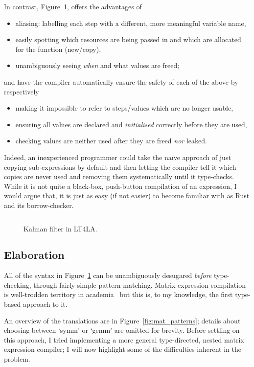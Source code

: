 In contrast, Figure~\ref{fig:ltfla_kalman}, offers the advantages of
\begin{itemize}
    \item aliasing: labelling each step with a different, more meaningful variable name,
    \item easily spotting which resources are being passed in and which are
        allocated for the function (new/copy),
    \item unambiguously seeing \emph{when} and what values are freed;
\end{itemize}
and have the compiler automatically ensure the safety of each of the above by respectively
\begin{itemize}
    \item making it impossible to refer to steps/values which are no longer usable,
    \item ensuring all values are declared and \emph{initialised} correctly before they are used,
    \item checking values are neither used after they are freed \emph{nor} leaked.
\end{itemize}

Indeed, an inexperienced programmer could take the  na\"ive approach of just
copying sub-expressions by default and then letting the compiler tell it which
copies are never used and removing them systematically until it type-checks.
While it is not quite a black-box, push-button compilation of an expression, I
would argue that, it is just as easy (if not easier) to become familiar with as
Rust and its borrow-checker.

\begin{figure}[tp]
    \inputminted[linenos, fontsize=\small]{ocaml}{../test/examples/kalman.lt}
    \caption{Kalman filter in LT4LA.}\label{fig:ltfla_kalman}
\end{figure}

\subsection{Elaboration}

All of the syntax in Figure~\ref{fig:ltfla_kalman} can be unambiguously
desugared \emph{before} type-checking, through fairly simple pattern matching.
Matrix expression compilation is well-trodden territory in
academia~\cite{rocklin_thesis, fabregat_thesis, gunnels_flame, linnea, taco}
but this is, to my knowledge, the first type-based approach to it.

An overview of the translations are in Figure~\ref{fig:mat_patterns}; details
about choosing between `symm' or `gemm' are omitted for brevity. Before
settling on this approach, I tried implementing a more general type-directed,
nested matrix expression compiler; I will now highlight some of the
difficulties inherent in the problem.

